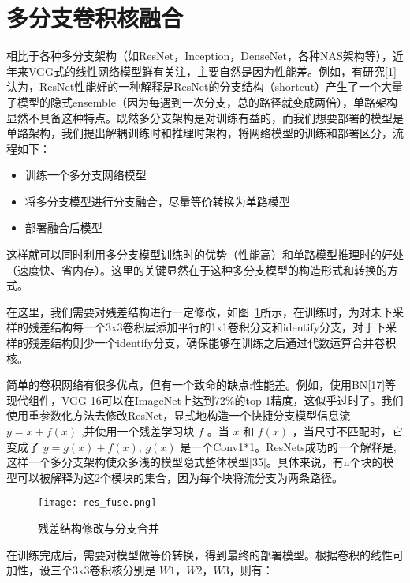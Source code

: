 \section{多分支卷积核融合}

相比于各种多分支架构（如ResNet，Inception，DenseNet，各种NAS架构等），近年来VGG式的线性网络模型鲜有关注，主要自然是因为性能差。例如，有研究[1]认为，ResNet性能好的一种解释是ResNet的分支结构（shortcut）产生了一个大量子模型的隐式ensemble（因为每遇到一次分支，总的路径就变成两倍），单路架构显然不具备这种特点。既然多分支架构是对训练有益的，而我们想要部署的模型是单路架构，我们提出解耦训练时和推理时架构，将网络模型的训练和部署区分，流程如下：

\begin{itemize}
    \item[1)] 训练一个多分支网络模型
    \item[2)] 将多分支模型进行分支融合，尽量等价转换为单路模型
    \item[3)] 部署融合后模型
\end{itemize}

这样就可以同时利用多分支模型训练时的优势（性能高）和单路模型推理时的好处（速度快、省内存）。这里的关键显然在于这种多分支模型的构造形式和转换的方式。

在这里，我们需要对残差结构进行一定修改，如图~\ref{fig:res-fuse}所示，在训练时，为对未下采样的残差结构每一个3x3卷积层添加平行的1x1卷积分支和identify分支，对于下采样的残差结构则少一个identify分支，确保能够在训练之后通过代数运算合并卷积核。

简单的卷积网络有很多优点，但有一个致命的缺点:性能差。例如，使用BN[17]等现代组件，VGG-16可以在ImageNet上达到72\%的top-1精度，这似乎过时了。我们使用重参数化方法去修改ResNet，显式地构造一个快捷分支模型信息流 $y = x + f(x)$ ,并使用一个残差学习块 $f$ 。当 $x$ 和 $f(x)$ ，当尺寸不匹配时，它变成了 $y = g(x) + f(x)$, $g(x)$ 是一个Conv1*1。ResNets成功的一个解释是,这样一个多分支架构使众多浅的模型隐式整体模型[35]。具体来说，有n个块的模型可以被解释为这2个模块的集合，因为每个块将流分支为两条路径。

\begin{figure}[]
    \centering
    \texttt{[image: res\_fuse.png]}	%
    \caption{残差结构修改与分支合并}
    \label{fig:res-fuse} %
\end{figure}

在训练完成后，需要对模型做等价转换，得到最终的部署模型。根据卷积的线性可加性，设三个3x3卷积核分别是 $W1$，$W2$，$W3$，则有：

